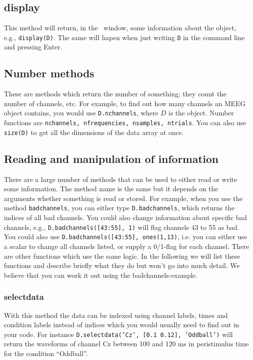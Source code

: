 \subsection{display}
This method will return, in the \matlab\ window, some information about the object, e.g., \texttt{display(D)}. The same will hapen when just writing \texttt{D} in the command line and pressing Enter.

\subsection{Number methods}
These are methods which return the number of something; they count the number of channels, etc. For example, to find out how many channels an MEEG object contains, you would use \texttt{D.nchannels}, where $D$ is the object. Number functions are \texttt{nchannels, nfrequencies, nsamples, ntrials}. You can also use \texttt{size(D)} to get all the dimensions of the data array at once.

\subsection{Reading and manipulation of information}
There are a large number of methods that can be used to either read or write some information. The method name is the same but it depends on the arguments whether something is read or stored. For example, when you use the method \texttt{badchannels}, you can either type \texttt{D.badchannels}, which returns the indices of all bad channels. You could also change information about specific bad channels, e.g., \texttt{D.badchannels([43:55], 1)} will flag channels 43 to 55 as bad. You   could also use \texttt{D.badchannels([43:55], ones(1,13)}, i.e. you can either use a scalar to change all channels listed, or supply a 0/1-flag for each channel. There are other functions which use the same logic. In the following we will list these functions and describe briefly what they do but won't go into much detail. We believe that you can work it out using the badchannels-example.

\subsubsection{selectdata}
With this method the data can be indexed using channel labels, times and condition labels instead of indices which you would usually need to find out in your code. For instance \texttt{D.selectdata('Cz', [0.1 0.12], 'Oddball')} will return the waveforms of channel Cz between 100 and 120 ms in peristimulus time for the condition ``Oddball''.


